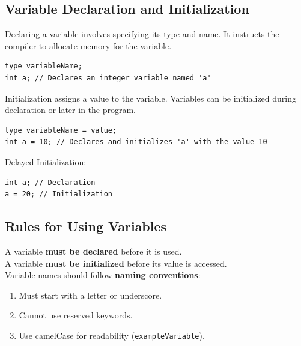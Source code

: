 \documentclass[letterpaper,12pt]{article}
\begin{document}
\subsection{Variable Declaration and Initialization}
Declaring a variable involves specifying its type and name. It instructs the compiler to allocate memory for the variable.
\begin{verbatim}
type variableName;
int a; // Declares an integer variable named 'a'
\end{verbatim}
Initialization assigns a value to the variable. Variables can be initialized during declaration or later in the program.
\begin{verbatim}
type variableName = value;
int a = 10; // Declares and initializes 'a' with the value 10
\end{verbatim}
Delayed Initialization:
\begin{verbatim}
int a; // Declaration
a = 20; // Initialization
\end{verbatim}
\subsection{Rules for Using Variables}
A variable \textbf{must be declared} before it is used.\\
A variable \textbf{must be initialized} before its value is accessed.\\
Variable names should follow \textbf{naming conventions}:
\begin{enumerate}
    \item Must start with a letter or underscore.
    \item Cannot use reserved keywords.
    \item Use camelCase for readability (\texttt{exampleVariable}).
\end{enumerate}
\end{document}
